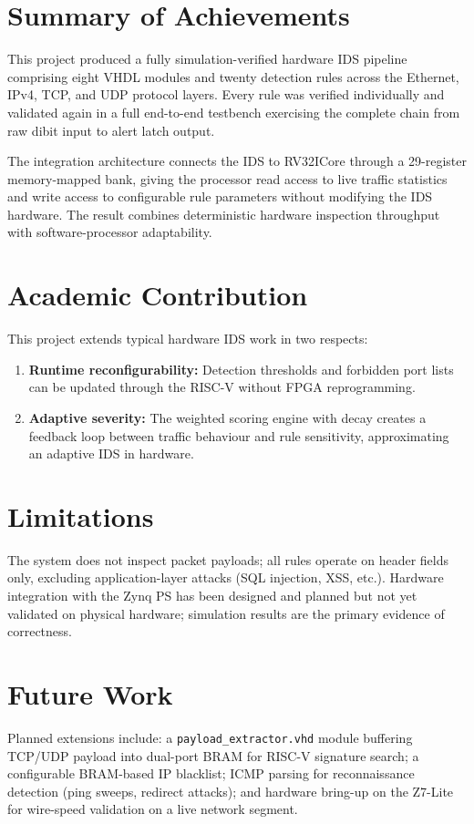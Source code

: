 \section{Summary of Achievements}
This project produced a fully simulation-verified hardware IDS pipeline comprising eight VHDL modules and twenty detection rules across the Ethernet, IPv4, TCP, and UDP protocol layers. Every rule was verified individually and validated again in a full end-to-end testbench exercising the complete chain from raw dibit input to alert latch output.

The integration architecture connects the IDS to RV32ICore through a 29-register memory-mapped bank, giving the processor read access to live traffic statistics and write access to configurable rule parameters without modifying the IDS hardware. The result combines deterministic hardware inspection throughput with software-processor adaptability.

\section{Academic Contribution}
This project extends typical hardware IDS work in two respects:
\begin{enumerate}
	\item \textbf{Runtime reconfigurability:} Detection thresholds and forbidden port lists can be updated through the RISC-V without FPGA reprogramming.
	\item \textbf{Adaptive severity:} The weighted scoring engine with decay creates a feedback loop between traffic behaviour and rule sensitivity, approximating an adaptive IDS in hardware.
\end{enumerate}

\section{Limitations}
The system does not inspect packet payloads; all rules operate on header fields only, excluding application-layer attacks (SQL injection, XSS, etc.). Hardware integration with the Zynq PS has been designed and planned but not yet validated on physical hardware; simulation results are the primary evidence of correctness.

\section{Future Work}
Planned extensions include: a \texttt{payload\_extractor.vhd} module buffering TCP/UDP payload into dual-port BRAM for RISC-V signature search; a configurable BRAM-based IP blacklist; ICMP parsing for reconnaissance detection (ping sweeps, redirect attacks); and hardware bring-up on the Z7-Lite for wire-speed validation on a live network segment.